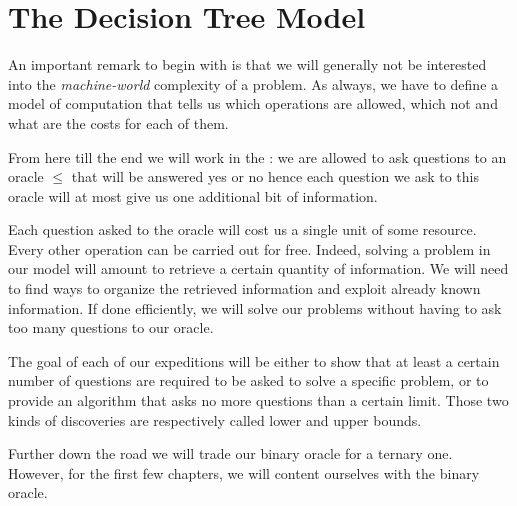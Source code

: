 \section{The Decision Tree Model}
\label{tree:sorting:model}

An important remark to begin with is that we will generally not be interested
into the \emph{machine-world} complexity of a problem. As always, we have to
define a model of computation that tells us which operations are allowed, which
not and what are the costs for each of them.

From here till the end we will work in the :
we are allowed to ask questions to an oracle \(\le\) that will be answered yes or
no hence each question we ask to this oracle will at most give us one
additional bit of information.

Each question asked to the oracle will cost us a single unit of some resource.
Every other operation can be carried out for free. Indeed, solving a problem in
our model will amount to retrieve a certain quantity of information. We will
need to find ways to organize the retrieved information and exploit already
known information. If done efficiently, we will solve our problems without
having to ask too many questions to our oracle.

The goal of each of our expeditions will be either to show that at least a
certain number of questions are required to be asked to solve a specific
problem, or to provide an algorithm that asks no more questions than a certain
limit. Those two kinds of discoveries are respectively called lower and upper
bounds.

Further down the road we will trade our binary oracle for a ternary one.
However, for the first few chapters, we will content ourselves with the binary
oracle.
